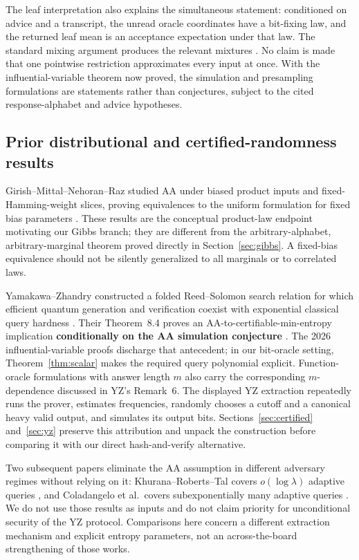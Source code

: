 \documentclass[11pt]{article}
\theoremstyle{definition}\newtheorem{definition}[theorem]{Definition}
\theoremstyle{remark}\newtheorem{remark}[theorem]{Remark}
\begin{document}
The leaf interpretation also explains the simultaneous statement: conditioned on advice and a transcript, the unread oracle coordinates have a bit-fixing law, and the returned leaf mean is an acceptance expectation under that law. The standard mixing argument produces the relevant mixtures \cite[Theorem~5.7]{LM26}. No claim is made that one pointwise restriction approximates every input at once. With the influential-variable theorem now proved, the simulation and presampling formulations are statements rather than conjectures, subject to the cited response-alphabet and advice hypotheses.

\subsection{Prior distributional and certified-randomness results}
Girish--Mittal--Nehoran--Raz studied AA under biased product inputs and fixed-Hamming-weight slices, proving equivalences to the uniform formulation for fixed bias parameters \cite{GMNR26}. These results are the conceptual product-law endpoint motivating our Gibbs branch; they are different from the arbitrary-alphabet, arbitrary-marginal theorem proved directly in Section~\ref{sec:gibbs}. A fixed-bias equivalence should not be silently generalized to all marginals or to correlated laws.

Yamakawa--Zhandry constructed a folded Reed--Solomon search relation for which efficient quantum generation and verification coexist with exponential classical query hardness \cite{YZ24}. Their Theorem~8.4 proves an AA-to-certifiable-min-entropy implication \textbf{conditionally on the AA simulation conjecture} \cite[Conjecture~8.1 and Theorem~8.4]{YZ24}. The 2026 influential-variable proofs discharge that antecedent; in our bit-oracle setting, Theorem~\ref{thm:scalar} makes the required query polynomial explicit. Function-oracle formulations with answer length \(m\) also carry the corresponding \(m\)-dependence discussed in YZ's Remark~6. The displayed YZ extraction repeatedly runs the prover, estimates frequencies, randomly chooses a cutoff and a canonical heavy valid output, and simulates its output bits. Sections~\ref{sec:certified} and~\ref{sec:yz} preserve this attribution and unpack the construction before comparing it with our direct hash-and-verify alternative.

Two subsequent papers eliminate the AA assumption in different adversary regimes without relying on it: Khurana--Roberts--Tal covers \(o(\log\lambda)\) adaptive queries \cite{KRT26}, and Coladangelo et al.\ covers subexponentially many adaptive queries \cite{CKMRSST26}. We do not use those results as inputs and do not claim priority for unconditional security of the YZ protocol. Comparisons here concern a different extraction mechanism and explicit entropy parameters, not an across-the-board strengthening of those works.
\end{document}

